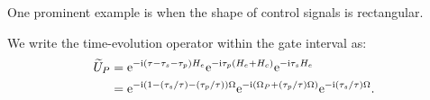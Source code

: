 \documentclass[b5paper,11pt]{article}
\newcommand{\wt}[1]{\widetilde{#1}}
\begin{document}
One prominent example is when the shape of control signals is rectangular.


We write the time-evolution operator within the gate interval as:
\begin{equation}
\begin{split}
 \wt U_{P}  & =
 \upe^{-\upi (\tau-\tau_s-\tau_p) H_e }
 \upe^{-\upi \tau_p (H_e+H_c)}  \upe^{-\upi \tau_s H_e} \\
 & =  \upe^{-\upi (1-(\tau_s/\tau)-(\tau_p/\tau)) \Omega }
 \upe^{-\upi (\Omega_P+(\tau_p/\tau)\Omega)}  \upe^{-\upi (\tau_s/\tau) \Omega}
 .
\end{split}
\end{equation}

\end{document}
